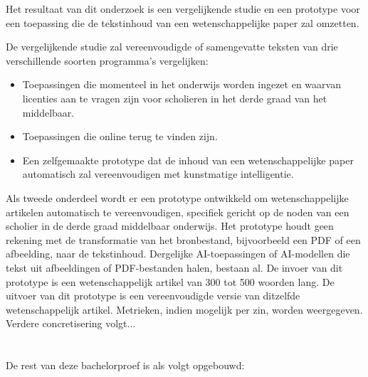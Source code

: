 
Het resultaat van dit onderzoek is een vergelijkende studie en een prototype voor een toepassing die de tekstinhoud van een wetenschappelijke paper zal omzetten.

De vergelijkende studie zal vereenvoudigde of samengevatte teksten van drie verschillende soorten programma's vergelijken:
\begin{itemize}
	\item Toepassingen die momenteel in het onderwijs worden ingezet en waarvan licenties aan te vragen zijn voor scholieren in het derde graad van het middelbaar.
	\item Toepassingen die online terug te vinden zijn.
	\item Een zelfgemaakte prototype dat de inhoud van een wetenschappelijke paper automatisch zal vereenvoudigen met kunstmatige intelligentie.
\end{itemize}

Als tweede onderdeel wordt er een prototype ontwikkeld om wetenschappelijke artikelen automatisch te vereenvoudigen, specifiek gericht op de noden van een scholier in de derde graad middelbaar onderwijs. Het prototype houdt geen rekening met de transformatie van het bronbestand, bijvoorbeeld een PDF of een afbeelding, naar de tekstinhoud. Dergelijke AI-toepassingen of AI-modellen die tekst uit afbeeldingen of PDF-bestanden halen, bestaan al. De invoer van dit prototype is een wetenschappelijk artikel van 300 tot 500 woorden lang. De uitvoer van dit prototype is een vereenvoudigde versie van ditzelfde wetenschappelijk artikel. Metrieken, indien mogelijk per zin, worden weergegeven. Verdere concretisering volgt...

\section{}%
\label{sec:opzet-bachelorproef}


De rest van deze bachelorproef is als volgt opgebouwd:

